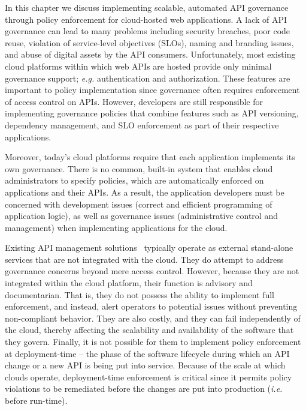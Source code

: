 In this chapter we discuss implementing scalable, automated API governance 
through policy enforcement for cloud-hosted web applications.
A lack of API governance can lead to many problems including security breaches, 
poor code reuse, violation of service-level objectives (SLOs), 
naming and branding issues, and abuse of digital 
assets by the API consumers. Unfortunately, most existing cloud platforms
within which web APIs are hosted provide only minimal governance support; 
{\em e.g.} authentication and authorization.  These features
are important to policy implementation since governance often requires
enforcement of access control on APIs.  
However, developers are still responsible for implementing governance policies
that combine features such as API versioning, 
dependency management, and SLO enforcement as part of their respective
applications.  

Moreover, today's cloud platforms require that each application
implements its own governance. There is no common, built-in system that enables
cloud administrators to specify policies, which are automatically enforced on 
applications and their APIs.
As a result, the application developers must be concerned with development issues (correct
and efficient programming of application logic), as well as governance issues 
(administrative control and management) when implementing applications for the cloud.

Existing API management solutions~\cite{3scale,apigee,layer7} typically operate as
external stand-alone services that are not integrated with the cloud. They do attempt to
address governance concerns beyond mere access control. However, because they
are not integrated within the cloud platform, their function is
advisory and documentarian.  That is, they 
do not possess the ability to implement full enforcement, and instead, alert
operators to potential issues without preventing non-compliant behavior.
They are also costly, and they can fail independently of the cloud, thereby affecting 
the scalability and availability of the software that they govern.
Finally, it is not possible for them to
implement policy enforcement at deployment-time -- the phase of the software lifecycle
during which an API change or a new API is being put into service.
Because of the scale at which clouds operate, deployment-time enforcement is
critical since it permits policy violations to be remediated before the
changes are put into production ({\em i.e.} before run-time).

